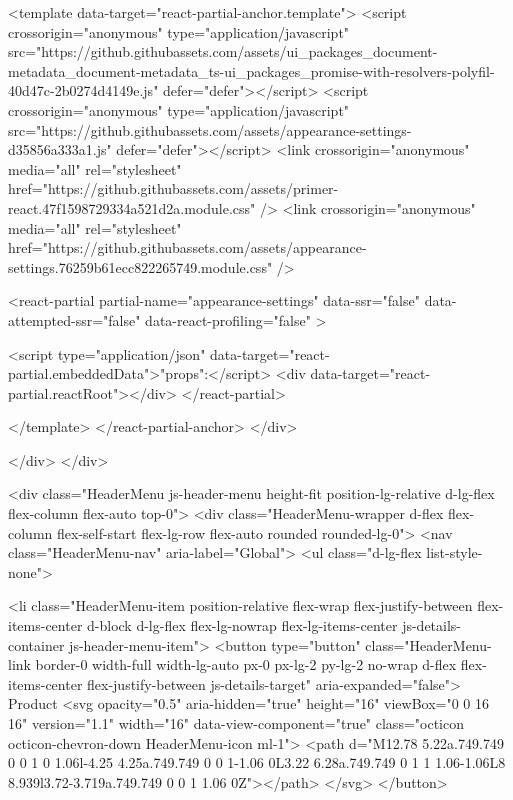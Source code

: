       <template data-target="react-partial-anchor.template">
        <script crossorigin="anonymous" type="application/javascript" src="https://github.githubassets.com/assets/ui_packages_document-metadata_document-metadata_ts-ui_packages_promise-with-resolvers-polyfil-40d47c-2b0274d4149e.js" defer="defer"></script>
<script crossorigin="anonymous" type="application/javascript" src="https://github.githubassets.com/assets/appearance-settings-d35856a333a1.js" defer="defer"></script>
<link crossorigin="anonymous" media="all" rel="stylesheet" href="https://github.githubassets.com/assets/primer-react.47f1598729334a521d2a.module.css" />
<link crossorigin="anonymous" media="all" rel="stylesheet" href="https://github.githubassets.com/assets/appearance-settings.76259b61ecc822265749.module.css" />

<react-partial
  partial-name="appearance-settings"
  data-ssr="false"
  data-attempted-ssr="false"
  data-react-profiling="false"
>
  
  <script type="application/json" data-target="react-partial.embeddedData">{"props":{}}</script>
  <div data-target="react-partial.reactRoot"></div>
</react-partial>

      </template>
    </react-partial-anchor>
  </div>

      </div>
    </div>


    <div class="HeaderMenu js-header-menu height-fit position-lg-relative d-lg-flex flex-column flex-auto top-0">
      <div class="HeaderMenu-wrapper d-flex flex-column flex-self-start flex-lg-row flex-auto rounded rounded-lg-0">
          <nav class="HeaderMenu-nav" aria-label="Global">
            <ul class="d-lg-flex list-style-none">


                <li class="HeaderMenu-item position-relative flex-wrap flex-justify-between flex-items-center d-block d-lg-flex flex-lg-nowrap flex-lg-items-center js-details-container js-header-menu-item">
      <button type="button" class="HeaderMenu-link border-0 width-full width-lg-auto px-0 px-lg-2 py-lg-2 no-wrap d-flex flex-items-center flex-justify-between js-details-target" aria-expanded="false">
        Product
        <svg opacity="0.5" aria-hidden="true" height="16" viewBox="0 0 16 16" version="1.1" width="16" data-view-component="true" class="octicon octicon-chevron-down HeaderMenu-icon ml-1">
    <path d="M12.78 5.22a.749.749 0 0 1 0 1.06l-4.25 4.25a.749.749 0 0 1-1.06 0L3.22 6.28a.749.749 0 1 1 1.06-1.06L8 8.939l3.72-3.719a.749.749 0 0 1 1.06 0Z"></path>
</svg>
      </button>

